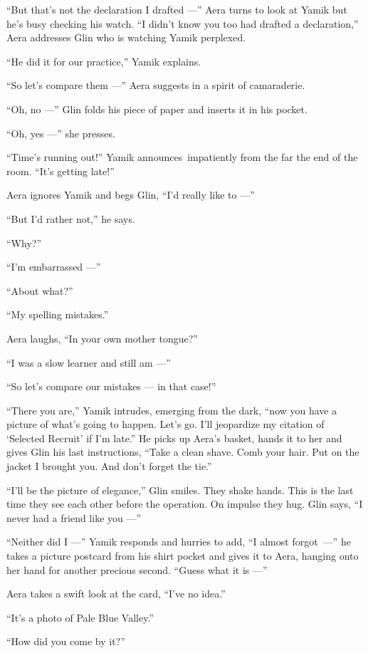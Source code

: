 \documentclass[twoside,11pt,openany]{book}
\begin{document}
``But that's not the declaration I drafted ---'' Aera turns to look at Yamik but he's busy
checking his watch. ``I didn't know you too had drafted a declaration,'' Aera addresses Glin
who is watching Yamik perplexed.

``He did it for our practice,'' Yamik explains.

``So let's compare them ---'' Aera suggests in a spirit of camaraderie.

``Oh, no ---'' Glin folds his piece of paper and inserts it in his pocket.

``Oh, yes ---'' she presses.

``Time's running out!'' Yamik announces~impatiently from the far the end of the room.
``It's getting late!''

Aera ignores Yamik and begs Glin, ``I'd really like to ---''

``But I'd rather not,'' he says.

``Why?''

``I'm embarrassed ---''

``About what?''

``My spelling mistakes.''

Aera laughs, ``In your own mother tongue?''

``I was a slow learner and still am ---''

``So let's compare our mistakes --- in that case!''

``There you are,'' Yamik intrudes, emerging from the dark, ``now you have a picture of
what's going to happen. Let's go. I'll jeopardize my citation of `Selected Recruit' if I'm late.''
He picks up Aera's basket, hands it to her and gives Glin his last instructions, ``Take a clean shave.
Comb your hair. Put on the jacket I brought you. And don't forget the tie.''

``I'll be the picture of elegance,'' Glin smiles. They shake hands. This is the last time they
see each other before the operation. On impulse they hug. Glin says, ``I never had a friend like you ---''

``Neither did I ---'' Yamik responds and hurries to add,
``I almost forgot~---'' he takes a picture postcard from his shirt pocket and
gives it to Aera, hanging onto her hand for another
precious second. ``Guess what it is ---''

Aera takes a swift look at{ }the card, ``I've no idea.''

``It's a photo of Pale Blue Valley.''

``How did you come by it?''
\end{document}

